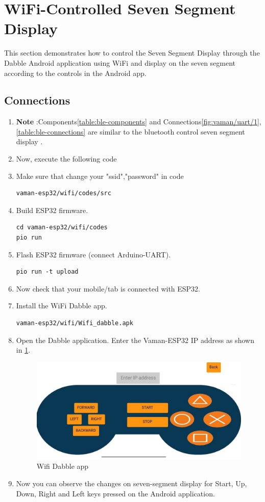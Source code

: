 \section{WiFi-Controlled Seven Segment Display}
This section demonstrates how to control the Seven Segment Display through the
Dabble Android application using WiFi and display on the seven segment according
to the controls in the Android app.

\subsection{Connections}
\begin{enumerate}[label=\thesection.\arabic*.,ref=\thesection.\theenumi]
\item \textbf{Note} :Components\ref{table:ble-components} and  Connections\ref{fig:vaman/uart/1},\ref{table:ble-connections} are similar to the bluetooth control seven segment display .
\item Now, execute the following code
\item Make sure that change your "ssid","password" in code 
\begin{lstlisting}
vaman-esp32/wifi/codes/src
\end{lstlisting}
\item Build ESP32 firmware.
\begin{lstlisting}
cd vaman-esp32/wifi/codes
pio run 
\end{lstlisting}
\item Flash ESP32 firmware (connect Arduino-UART).
\begin{lstlisting}
pio run -t upload
\end{lstlisting}
\item Now check that your mobile/tab is connected with ESP32.
\item Install the WiFi Dabble app.
\begin{lstlisting}
vaman-esp32/wifi/Wifi_dabble.apk
\end{lstlisting}

\item Open the Dabble application. Enter the Vaman-ESP32 IP address as shown 
in \ref{fig:dabble}.
\begin{figure}[!ht]
\centering
\includegraphics[width=0.6\columnwidth]{vaman-esp32/wifi/figs/wifi.jpg}
\caption{Wifi Dabble app}
\label{fig:dabble}
\end{figure}
\item Now you can observe the changes on seven-segment display for Start, Up, 
Down, Right and Left keys pressed on the Android application.
\end{enumerate}
